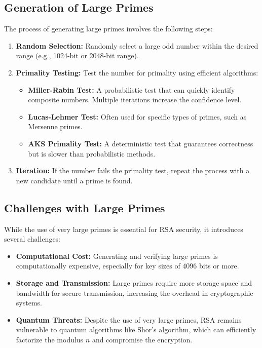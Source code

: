 \documentclass[12pt,a4paper]{report}
\begin{document}
\subsection{Generation of Large Primes}
The process of generating large primes involves the following steps:
\begin{enumerate}
    \item \textbf{Random Selection:} Randomly select a large odd number within the desired range (e.g., 1024-bit or 2048-bit range).
    \item \textbf{Primality Testing:} Test the number for primality using efficient algorithms:
    \begin{itemize}
        \item \textbf{Miller-Rabin Test:} A probabilistic test that can quickly identify composite numbers. Multiple iterations increase the confidence level.
        \item \textbf{Lucas-Lehmer Test:} Often used for specific types of primes, such as Mersenne primes.
        \item \textbf{AKS Primality Test:} A deterministic test that guarantees correctness but is slower than probabilistic methods.
    \end{itemize}
    \item \textbf{Iteration:} If the number fails the primality test, repeat the process with a new candidate until a prime is found.
\end{enumerate}

\subsection{Challenges with Large Primes}
While the use of very large primes is essential for RSA security, it introduces several challenges:
\begin{itemize}
    \item \textbf{Computational Cost:} Generating and verifying large primes is computationally expensive, especially for key sizes of 4096 bits or more.
    \item \textbf{Storage and Transmission:} Large primes require more storage space and bandwidth for secure transmission, increasing the overhead in cryptographic systems.
    \item \textbf{Quantum Threats:} Despite the use of very large primes, RSA remains vulnerable to quantum algorithms like Shor's algorithm, which can efficiently factorize the modulus \( n \) and compromise the encryption.
\end{itemize}
\end{document}

